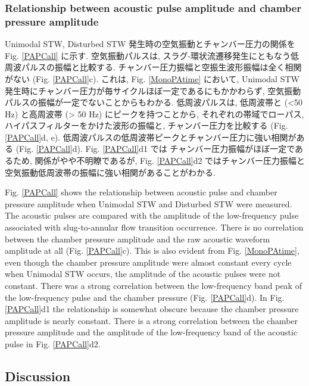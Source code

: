 \documentclass[12pt]{article}
\begin{document}
\subsubsection{Relationship between acoustic pulse amplitude and chamber pressure amplitude}\label{AcoChp}
Unimodal STW, Disturbed STW 発生時の空気振動とチャンバー圧力の関係を Fig. \ref{PAPCall} に示す. 
空気振動パルスは, スラグ-環状流遷移発生にともなう低周波パルスの振幅と比較する. 
チャンバー圧力振幅と空振生波形振幅は全く相関がない (Fig. \ref{PAPCall}c). 
これは, Fig. \ref{MonoPAtime} において, Unimodal STW 発生時にチャンバー圧力が毎サイクルほぼ一定であるにもかかわらず, 空気振動パルスの振幅が一定でないことからもわかる. 
低周波パルスは, 低周波帯と (<50 Hz) と高周波帯 (> 50 Hz) にピークを持つことから, それぞれの帯域でローパス, ハイパスフィルターをかけた波形の振幅と, チャンバー圧力を比較する (Fig. \ref{PAPCall}d, e). 
低周波パルスの低周波帯ピークとチャンバー圧力に強い相関がある (Fig. \ref{PAPCall}d). 
Fig. \ref{PAPCall}d1 では チャンバー圧力振幅がほぼ一定であるため, 関係がやや不明瞭であるが, Fig. \ref{PAPCall}d2 ではチャンバー圧力振幅と空気振動低周波帯の振幅に強い相関があることがわかる.

Fig. \ref{PAPCall} shows the relationship between acoustic pulse and chamber pressure amplitude when Unimodal STW and Disturbed STW were measured.
The acoustic pulses are compared with the amplitude of the low-frequency pulse associated with slug-to-annular flow transition occurrence.
There is no correlation between the chamber pressure amplitude and the raw acoustic waveform amplitude at all (Fig. \ref {PAPCall}c).
This is also evident from Fig. \ref{MonoPAtime}, even though the chamber pressure amplitude were almost constant every cycle when Unimodal STW occurs, the amplitude of the acoustic pulses were not constant.
There was a strong correlation between the low-frequency band peak of the low-frequency pulse and the chamber pressure (Fig. \ref {PAPCall}d).
In Fig. \ref {PAPCall}d1 the relationship is somewhat obscure because the chamber pressure amplitude is nearly constant.
There is a strong correlation between the chamber pressure amplitude and the amplitude of the low-frequency band of the acoustic pulse in Fig. \ref {PAPCall}d2.

\clearpage
\subsection{Discussion}\label{ACOdisc}
\end{document}
